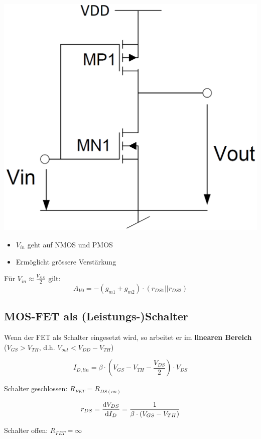 \begin{minipage}[c]{0.35\columnwidth}
    \includegraphics[width=\columnwidth]{images/push_pull_digital_inverter.png}
\end{minipage}
\hfill
\begin{minipage}[c]{0.5\columnwidth}
    \begin{itemize}
        \item $V_{in}$ geht auf NMOS und PMOS
        \item Ermöglicht grössere Verstärkung
    \end{itemize}
        
    \vspace{0.3cm}
    Für $V_{in} \approx \frac{V_{DD}}{2}$ gilt:
    $$ A_{V0} = -(g_{m1} + g_{m2}) \cdot (r_{DS1} || r_{DS2}) $$
\end{minipage}


\subsection{MOS-FET als (Leistungs-)Schalter}
Wenn der FET als Schalter eingesetzt wird, so arbeitet er im \textbf{linearen Bereich} \\
($V_{GS} > V_{TH}$, d.h. $V_{out} < V_{DD} - V_{TH} $)

\begin{minipage}[c]{0.49\columnwidth}
    $$ I_{D,lin} = \beta \cdot ( V_{GS} - V_{TH} - \frac{V_{DS}}{2} ) \cdot V_{DS} $$
    \begin{center}
        
        Schalter geschlossen: $R_{FET} = R_{DS(on)} $
    \end{center}
\end{minipage}
\hfill
\begin{minipage}[c]{0.49\columnwidth}
    $$ r_{DS} = \dfrac{\mathop{} \! \mathrm{d} V_{DS}}{\mathop{} \! \mathrm{d} I_D} = \frac{1}{\beta \cdot (V_{GS} - V_{TH})}  $$
    \begin{center}
        Schalter offen: $R_{FET} = \infty$ 
    \end{center}
\end{minipage}



